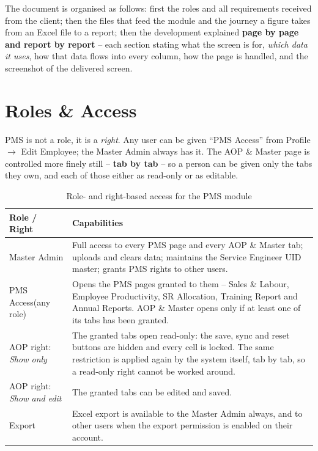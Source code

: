 \documentclass[11pt,a4paper]{article}
\newcommand{\qt}[1]{\textquotedblleft #1\textquotedblright}
\begin{document}
The document is organised as follows: first the roles and all requirements received
from the client; then the files that feed the module and the journey a figure takes
from an Excel file to a report; then the development explained \textbf{page by page and
report by report} -- each section stating what the screen is for, \emph{which data it
uses}, how that data flows into every column, how the page is handled, and the
screenshot of the delivered screen.

\section{Roles \& Access}

PMS is not a role, it is a \emph{right}. Any user can be given \qt{PMS Access} from
Profile $\rightarrow$ Edit Employee; the Master Admin always has it. The AOP \& Master
page is controlled more finely still -- \textbf{tab by tab} -- so a person can be given
only the tabs they own, and each of those either as read-only or as editable.

\begin{table}[H]\centering\small
\begin{tabularx}{\linewidth}{@{}p{3.4cm}X@{}}
\toprule
\textbf{Role / Right} & \textbf{Capabilities} \\
\midrule
Master Admin &
Full access to every PMS page and every AOP \& Master tab; uploads and clears data;
maintains the Service Engineer UID master; grants PMS rights to other users. \\
\addlinespace
PMS Access\newline (any role) &
Opens the PMS pages granted to them -- Sales \& Labour, Employee Productivity,
SR Allocation, Training Report and Annual Reports. AOP \& Master opens only if at
least one of its tabs has been granted. \\
\addlinespace
AOP right: \textit{Show only} &
The granted tabs open read-only: the save, sync and reset buttons are hidden and every
cell is locked. The same restriction is applied again by the system itself, tab by tab,
so a read-only right cannot be worked around. \\
\addlinespace
AOP right: \textit{Show and edit} &
The granted tabs can be edited and saved. \\
\addlinespace
Export &
Excel export is available to the Master Admin always, and to other users when the
export permission is enabled on their account. \\
\bottomrule
\end{tabularx}
\caption{Role- and right-based access for the PMS module}
\end{table}
\end{document}
